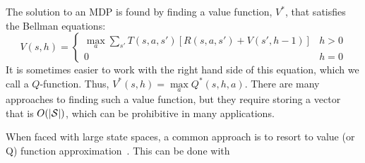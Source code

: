 The solution to an MDP is found by finding a value function, $V^*$, that satisfies the Bellman equations:
$$V(s, h) = \left\{ \begin{array}{cl} \underset{a}{\max} \underset{s'}{\sum} T(s, a, s')[R(s, a, s') + V(s', h-1)] & h >0 \\ 0 & h = 0\end{array}\right.$$
It is sometimes easier to work with the right hand side of this equation, which we call a $Q$-function. Thus, $V^*(s, h) = \underset{a}{\max}Q^*(s, h, a)$.
There are many approaches to finding such a value function, but they require storing a vector that is $O(|\mathcal{S}{}|)$, which can be prohibitive in many applications. 


When faced with large state spaces, a common approach is to resort to value (or Q) function approximation~\cite{schweitzer1985generalized}. This can be done with 

